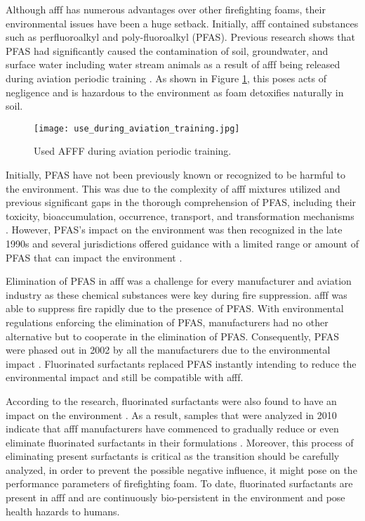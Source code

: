 Although \acrshort{afff} has numerous advantages over other firefighting foams, their environmental issues have been a huge setback. Initially, \acrshort{afff} contained substances such as perfluoroalkyl and poly-fluoroalkyl (PFAS). Previous research shows that PFAS had significantly caused the contamination of soil, groundwater, and surface water including water stream animals as a result of \acrshort{afff} being released during aviation periodic training \cite{milley2018estimating}. As shown in Figure \ref{ch2:figure:use}, this poses acts of negligence and is hazardous to the environment as foam detoxifies naturally in soil.

\begin{figure}[H]
    \centering
    \texttt{[image: use\_during\_aviation\_training.jpg]}
    \caption{Used AFFF during aviation periodic training.}
    \label{ch2:figure:use}
\end{figure}

Initially, PFAS have not been previously known or recognized to be harmful to the environment. This was due to the complexity of \acrshort{afff} mixtures utilized and previous significant gaps in the thorough comprehension of PFAS, including their toxicity, bioaccumulation, occurrence, transport, and transformation mechanisms \cite{milley2018estimating}. However, PFAS's impact on the environment was then recognized in the late 1990s and several jurisdictions offered guidance with a limited range or amount of PFAS that can impact the environment \cite{hinnant2017influence}. 

Elimination of PFAS in \acrshort{afff} was a challenge for every manufacturer and aviation industry as these chemical substances were key during fire suppression. \acrshort{afff} was able to suppress fire rapidly due to the presence of PFAS. With environmental regulations enforcing the elimination of PFAS, manufacturers had no other alternative but to cooperate in the elimination of PFAS. Consequently, PFAS were phased out in 2002 by all the manufacturers due to the environmental impact \cite{persson2003foamspex}.  Fluorinated surfactants replaced PFAS instantly intending to reduce the environmental impact and still be compatible with \acrshort{afff}.  

According to the research, fluorinated surfactants were also found to have an impact on the environment \cite{martin2012fire}. As a result, samples that were analyzed in 2010 indicate that \acrshort{afff} manufacturers have commenced to gradually reduce or even eliminate fluorinated surfactants in their formulations \cite{milley2018estimating}. Moreover, this process of eliminating present surfactants is critical as the transition should be carefully analyzed, in order to prevent the possible negative influence, it might pose on the performance parameters of firefighting foam. To date, fluorinated surfactants are present in \acrshort{afff} and are continuously bio-persistent in the environment and pose health hazards to humans. 

